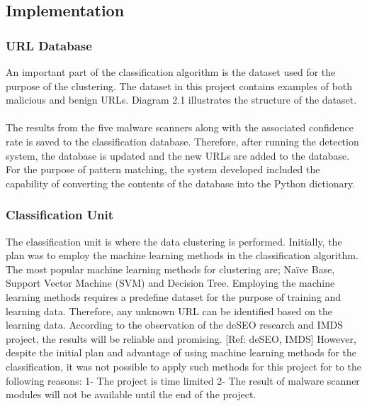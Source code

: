 
\subsection{Implementation}

\subsubsection{URL Database}

An important part of the classification algorithm is the dataset used for the purpose of the clustering. The dataset in this project contains examples of both malicious and benign URLs. Diagram 2.1 illustrates the structure of the dataset.  


\paragraph{} 
The results from the five malware scanners along with the associated confidence rate is saved to the classification database. Therefore, after running the detection system, the database is updated and the new URLs are added to the database. For the purpose of pattern matching, the system developed included the capability of converting the contents of the database into the Python dictionary.

\subsubsection{Classification Unit}
 
The classification unit is where the data clustering is performed. Initially, the plan was to employ the machine learning methods in the classification algorithm. The most popular machine learning methods for clustering are; Naïve Base, Support Vector Machine (SVM) and Decision Tree. Employing the machine learning methods requires a predefine dataset for the purpose of training and learning data. Therefore, any unknown URL can be identified based on the learning data. According to the observation of the deSEO research and IMDS project, the results will be reliable and promising. [Ref: deSEO, IMDS]
However, despite the initial plan and advantage of using machine learning methods for the classification, it was not possible to apply such methods for this project for to the following reasons:
1-	The project is time limited  
2-	The result of malware scanner modules will not be available until the end of the project.

